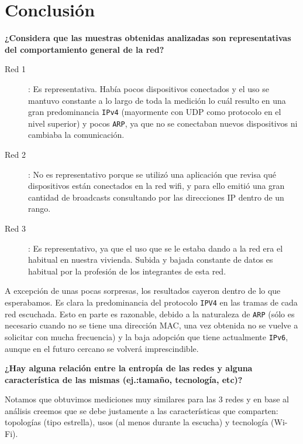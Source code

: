 \section{Conclusión}


\textbf{¿Considera que las muestras obtenidas analizadas son representativas del comportamiento general de la red?} %

\begin{description}
    \item[Red 1]: Es representativa. Había pocos dispositivos conectados y el uso se mantuvo constante a lo largo de toda la medición lo cuál resulto en una gran predominancia \texttt{IPv4} (mayormente con UDP como protocolo en el nivel superior) y pocos \texttt{ARP}, ya que no se conectaban nuevos dispositivos ni cambiaba la comunicación.
    
    \item[Red 2]: No es representativo porque se utilizó una aplicación que revisa qué dispositivos están conectados en la red wifi, y para ello emitió una gran cantidad de broadcasts consultando por las direcciones IP dentro de un rango.

    \item[Red 3]: Es representativo, ya que el uso que se le estaba dando a la red era el habitual en nuestra vivienda. Subida y bajada constante de datos es habitual por la profesión de los integrantes de esta red.
        
\end{description}

A excepción de unas pocas sorpresas, los resultados cayeron dentro de lo que esperabamos. Es clara la predominancia del protocolo \texttt{IPV4} en las tramas de cada red escuchada. Esto en parte es razonable, debido a la naturaleza de \texttt{ARP} (sólo es necesario cuando no se tiene una dirección MAC, una vez obtenida no se vuelve a solicitar con mucha frecuencia) y la baja adopción que tiene actualmente \texttt{IPv6}, aunque en el futuro cercano se volverá imprescindible. 


\newpage

\textbf{¿Hay alguna relación entre la entropía de las redes y alguna característica de las mismas (ej.:tamaño, tecnología, etc)?} %

Notamos que obtuvimos mediciones muy similares para las 3 redes y en base al análisis creemos que se debe justamente a las características que comparten: topologías (tipo estrella), usos (al menos durante la escucha) y tecnología (Wi-Fi).








